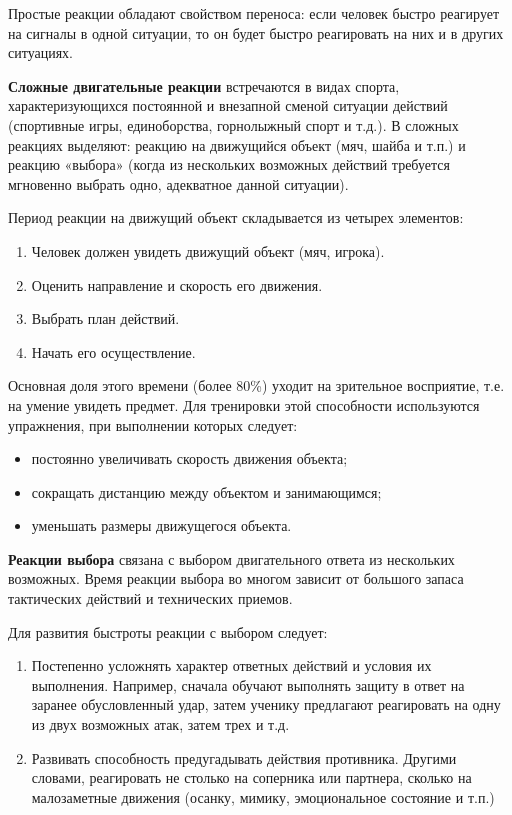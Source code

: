 Простые реакции обладают свойством переноса: если человек быстро реагирует на сигналы в одной ситуации, то он будет быстро
реагировать на них и в других ситуациях.

\textbf{Сложные двигательные реакции} встречаются в видах спорта, характеризующихся постоянной и внезапной сменой ситуации
действий (спортивные игры, единоборства, горнолыжный спорт и т.д.). В сложных реакциях выделяют: реакцию на движущийся объект
(мяч, шайба и т.п.) и реакцию «выбора» (когда из нескольких возможных действий требуется мгновенно выбрать одно,
адекватное данной ситуации).

Период реакции на движущий объект складывается из четырех элементов:
\begin{enumerate}
    \item Человек должен увидеть движущий объект (мяч, игрока).
    \item Оценить направление и скорость его движения.
    \item Выбрать план действий.
    \item Начать его осуществление.
\end{enumerate}

Основная доля этого времени (более 80\%) уходит на зрительное восприятие, т.е. на умение увидеть предмет.
Для тренировки этой способности используются упражнения, при выполнении которых следует:
\begin{itemize}
    \item постоянно увеличивать скорость движения объекта;
    \item сокращать дистанцию между объектом и занимающимся;
    \item уменьшать размеры движущегося объекта.
\end{itemize}

\textbf{Реакции выбора} связана с выбором двигательного ответа из нескольких возможных. Время реакции выбора во многом зависит
от большого запаса тактических действий и технических приемов.

Для развития быстроты реакции с выбором следует:
\begin{enumerate}
    \item Постепенно усложнять характер ответных действий и условия их выполнения. Например, сначала обучают выполнять защиту
          в ответ на заранее обусловленный удар, затем ученику предлагают реагировать на одну из двух возможных атак, затем трех и т.д.
    \item Развивать способность предугадывать действия противника. Другими словами, реагировать не столько на соперника или
          партнера, сколько на малозаметные движения (осанку, мимику, эмоциональное состояние и т.п.)
\end{enumerate}

